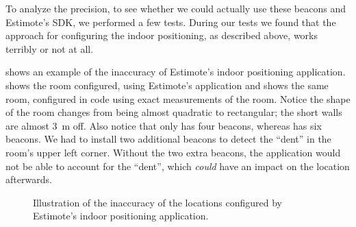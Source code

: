 To analyze the precision, 
to see whether we could actually use these beacons and Estimote's SDK, 
we performed a few tests. 
During our tests we found that the approach for configuring the indoor positioning, 
as described above, 
works terribly or not at all. 

 shows an example of the inaccuracy of Estimote's indoor positioning application. 
 shows the room configured, 
using Estimote's application and  shows the same room, 
configured in code using exact measurements of the room. 
Notice the shape of the room changes from being almost quadratic to rectangular;
the short walls are almost \SI{3}{\meter} off.
Also notice that  only has four beacons, 
whereas  has six beacons. 
We had to install two additional beacons to detect the ``dent'' in the room's upper left corner. 
Without the two extra beacons, 
the application would not be able to account for the ``dent'',
which \emph{could} have an impact on the location afterwards. 

\begin{figure}[!htb]%
    \centering
    \caption{Illustration of the inaccuracy of the locations configured by Estimote's indoor positioning application.}
    \label{fig:estimote-location-configuration}
\end{figure}

